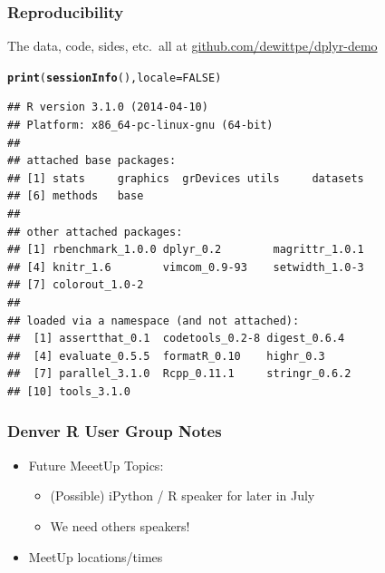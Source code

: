 \documentclass{beamer}\usepackage[]{graphicx}\usepackage[]{color}
\makeatletter
\newcommand{\hlnum}[1]{\textcolor[rgb]{0.686,0.059,0.569}{#1}}%
\newcommand{\hlstd}[1]{\textcolor[rgb]{0.345,0.345,0.345}{#1}}%
\newcommand{\hlkwc}[1]{\textcolor[rgb]{0.333,0.667,0.333}{#1}}%
\newcommand{\hlkwd}[1]{\textcolor[rgb]{0.737,0.353,0.396}{\textbf{#1}}}%
\newenvironment{kframe}{%
 \def\at@end@of@kframe{}%
 \ifinner\ifhmode%
  \def\at@end@of@kframe{\end{minipage}}%
  \begin{minipage}{\columnwidth}%
 \fi\fi%
 \def\FrameCommand##1{\hskip\@totalleftmargin \hskip-\fboxsep
 \colorbox{shadecolor}{##1}\hskip-\fboxsep
     \hskip-\linewidth \hskip-\@totalleftmargin \hskip\columnwidth}%
 \MakeFramed {\advance\hsize-\width
   \@totalleftmargin\z@ \linewidth\hsize
   \@setminipage}}%
 {\par\unskip\endMakeFramed%
 \at@end@of@kframe}
\newenvironment{knitrout}{}{} %
\makeatother
\begin{document}
\begin{frame}[fragile]
  \frametitle{Reproducibility}
  The data, code, sides, etc.\ all at \url{github.com/dewittpe/dplyr-demo}

\begin{knitrout}\footnotesize
{}\color{fgcolor}\begin{kframe}
\begin{alltt}
\hlkwd{print}\hlstd{(}\hlkwd{sessionInfo}\hlstd{(),} \hlkwc{locale} \hlstd{=} \hlnum{FALSE}\hlstd{)}
\end{alltt}
\begin{verbatim}
## R version 3.1.0 (2014-04-10)
## Platform: x86_64-pc-linux-gnu (64-bit)
## 
## attached base packages:
## [1] stats     graphics  grDevices utils     datasets 
## [6] methods   base     
## 
## other attached packages:
## [1] rbenchmark_1.0.0 dplyr_0.2        magrittr_1.0.1  
## [4] knitr_1.6        vimcom_0.9-93    setwidth_1.0-3  
## [7] colorout_1.0-2  
## 
## loaded via a namespace (and not attached):
##  [1] assertthat_0.1  codetools_0.2-8 digest_0.6.4   
##  [4] evaluate_0.5.5  formatR_0.10    highr_0.3      
##  [7] parallel_3.1.0  Rcpp_0.11.1     stringr_0.6.2  
## [10] tools_3.1.0
\end{verbatim}
\end{kframe}
\end{knitrout}
\end{frame} 

\begin{frame}[fragile]
  \frametitle{Denver R User Group Notes}
  \begin{itemize}
    \item Future MeeetUp Topics:
      \begin{itemize}
        \item (Possible) iPython / R speaker for later in July
        \item We need others speakers!
      \end{itemize}
    \item MeetUp locations/times
  \end{itemize}
\end{frame} 
\end{document}
